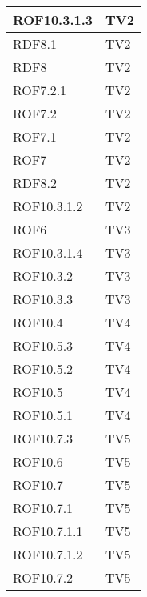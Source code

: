 \begin{center}
\begin{longtable}{|p{7cm}|p{7cm}|}
\midrule
ROF10.3.1.3
& TV2\\

\midrule
RDF8.1
& TV2\\

\midrule
RDF8
& TV2\\

\midrule
ROF7.2.1
& TV2\\

\midrule
ROF7.2
& TV2\\

\midrule
ROF7.1
& TV2\\

\midrule
ROF7
& TV2\\

\midrule
RDF8.2
& TV2\\

\midrule
ROF10.3.1.2
& TV2\\

\midrule
ROF6
& TV3\\

\midrule
ROF10.3.1.4
& TV3\\

\midrule
ROF10.3.2
& TV3\\

\midrule
ROF10.3.3
& TV3\\

\midrule
ROF10.4
& TV4\\

\midrule
ROF10.5.3
& TV4\\

\midrule
ROF10.5.2
& TV4\\

\midrule
ROF10.5
& TV4\\

\midrule
ROF10.5.1
& TV4\\

\midrule
ROF10.7.3
& TV5\\

\midrule
ROF10.6
& TV5\\

\midrule
ROF10.7
& TV5\\

\midrule
ROF10.7.1
& TV5\\

\midrule
ROF10.7.1.1
& TV5\\

\midrule
ROF10.7.1.2
& TV5\\

\midrule
ROF10.7.2
& TV5\\


\end{longtable}
\end{center}
